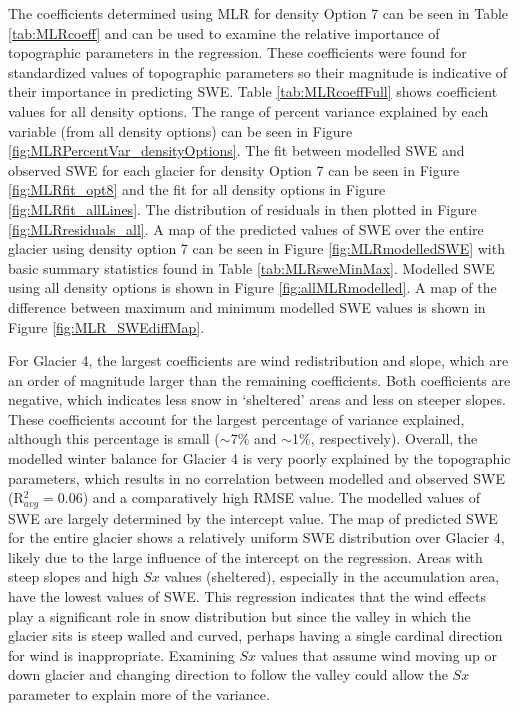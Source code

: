\documentclass[12pt]{article}
\begin{document}
The coefficients determined using MLR for density Option 7 can be seen in Table \ref{tab:MLRcoeff} and can be used to examine the relative importance of topographic parameters in the regression. These coefficients were found for standardized values of topographic parameters so their magnitude is indicative of their importance in predicting SWE. Table \ref{tab:MLRcoeffFull} shows coefficient values for all density options. The range of percent variance explained by each variable (from all density options) can be seen in Figure \ref{fig:MLRPercentVar_densityOptions}. The fit between modelled SWE and observed SWE for each glacier for density Option 7 can be seen in Figure \ref{fig:MLRfit_opt8} and the fit for all density options in Figure \ref{fig:MLRfit_allLines}. The distribution of residuals in then plotted in Figure \ref{fig:MLRresiduals_all}. A map of the predicted values of SWE over the entire glacier using density option 7 can be seen in Figure \ref{fig:MLRmodelledSWE} with basic summary statistics found in Table \ref{tab:MLRsweMinMax}. Modelled SWE using all density options is shown in Figure \ref{fig:allMLRmodelled}. A map of the difference between maximum and minimum modelled SWE values is shown in Figure \ref{fig:MLR_SWEdiffMap}.

For Glacier 4, the largest coefficients are wind redistribution and slope, which are an order of magnitude larger than the remaining coefficients. Both coefficients are negative, which indicates less snow in `sheltered' areas and less on steeper slopes. These coefficients account for the largest percentage of variance explained, although this percentage is small ($\sim$7\% and $\sim$1\%, respectively). Overall, the modelled winter balance for Glacier 4 is very poorly explained by the topographic parameters, which results in no correlation between modelled and observed SWE (R$^2_{avg}=0.06$) and a comparatively high RMSE value. The modelled values of SWE are largely determined by the intercept value. The map of predicted SWE for the entire glacier shows a relatively uniform SWE distribution over Glacier 4, likely due to the large influence of the intercept on the regression. Areas with steep slopes and high $Sx$ values (sheltered), especially in the accumulation area, have the lowest values of SWE. This regression indicates that the wind effects play a significant role in snow distribution but since the valley in which the glacier sits is steep walled and curved, perhaps having a single cardinal direction for wind is inappropriate. Examining $Sx$ values that assume wind moving up or down glacier and changing direction to follow the valley could allow the $Sx$ parameter to explain more of the variance. 
\end{document}

